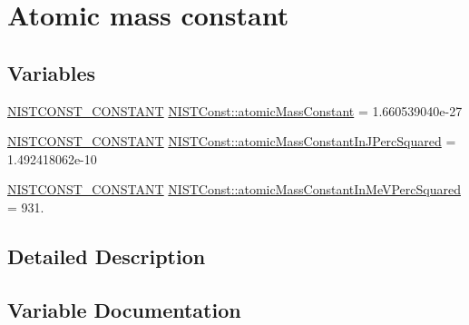\hypertarget{group___n_i_s_t_const-_atomic_mass_constant}{}\section{Atomic mass constant}
\label{group___n_i_s_t_const-_atomic_mass_constant}
\subsection*{Variables}
\begin{DoxyCompactItemize}
\item 
\mbox{\hyperlink{group___n_i_s_t_const-_macros_ga2b0fc1d7452373f816175dd86ce26729}{N\+I\+S\+T\+C\+O\+N\+S\+T\+\_\+\+C\+O\+N\+S\+T\+A\+NT}} \mbox{\hyperlink{group___n_i_s_t_const-_atomic_mass_constant_ga0425d000ba96e26f28e4728444142010}{N\+I\+S\+T\+Const\+::atomic\+Mass\+Constant}} = 1.\+660539040e-\/27
\item 
\mbox{\hyperlink{group___n_i_s_t_const-_macros_ga2b0fc1d7452373f816175dd86ce26729}{N\+I\+S\+T\+C\+O\+N\+S\+T\+\_\+\+C\+O\+N\+S\+T\+A\+NT}} \mbox{\hyperlink{group___n_i_s_t_const-_atomic_mass_constant_ga2e051baa0d89927080288e2289ac0346}{N\+I\+S\+T\+Const\+::atomic\+Mass\+Constant\+In\+J\+Perc\+Squared}} = 1.\+492418062e-\/10
\item 
\mbox{\hyperlink{group___n_i_s_t_const-_macros_ga2b0fc1d7452373f816175dd86ce26729}{N\+I\+S\+T\+C\+O\+N\+S\+T\+\_\+\+C\+O\+N\+S\+T\+A\+NT}} \mbox{\hyperlink{group___n_i_s_t_const-_atomic_mass_constant_ga050dd5d7f3c4ee37a9ff7456ce82f8d2}{N\+I\+S\+T\+Const\+::atomic\+Mass\+Constant\+In\+Me\+V\+Perc\+Squared}} = 931.
\end{DoxyCompactItemize}


\subsection{Detailed Description}


\subsection{Variable Documentation}
\mbox{\label{group___n_i_s_t_const-_atomic_mass_constant_ga0425d000ba96e26f28e4728444142010}} 
